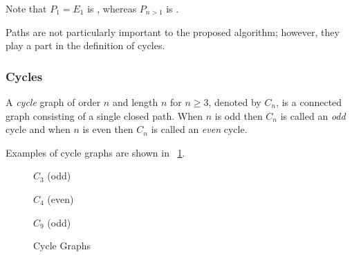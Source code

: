 Note that \(P_1=E_1\) is , whereas \(P_{n>1}\) is .

Paths are not particularly important to the proposed algorithm; however, they play a part in the definition of
cycles.

\subsubsection{Cycles}\label{sec:sub:sub:cycles}

A \emph{cycle} graph of order \(n\) and length \(n\) for \(n\ge3\), denoted by \(C_n\), is a connected graph
consisting of a single closed path.  When \(n\) is odd then \(C_n\) is called an \emph{odd} cycle and when \(n\) is
even then \(C_n\) is called an \emph{even} cycle.

Examples of cycle graphs are shown in \figurename~\ref{fig:cycle}.

\begin{figure}[H]
  \label{fig:cycle}
  \begin{minipage}{2in}
    \begin{center}

      \bigskip

      \(C_3\) (odd)
    \end{center}
  \end{minipage}
  \begin{minipage}{2in}
    \begin{center}

      \bigskip

      \(C_4\) (even)
    \end{center}
  \end{minipage}
  \begin{minipage}{2in}
    \begin{center}

      \bigskip

      \(C_9\) (odd)
    \end{center}
  \end{minipage}
  \caption{Cycle Graphs}
\end{figure}

